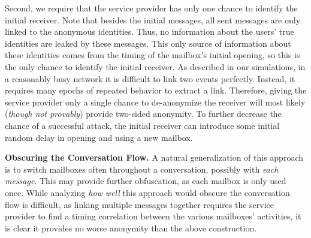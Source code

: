 Second, we require that the service provider has only one chance to identify the initial receiver.  Note that besides the initial messages, all sent messages are only linked to the anonymous identities.  Thus, no information about the users' true identities are leaked by these messages.  This only source of information about these identities comes from the timing of the mailbox's initial opening, so this is the only chance to identify the initial receiver.   
As described in our simulations, in a reasonably busy network it is difficult to link two events perfectly.  Instead, it requires many epochs of repeated behavior to extract a link.  Therefore, giving the service provider only a single chance to de-anonymize the receiver will most likely (\emph{though not provably}) provide two-sided anonymity.
To further decrease the chance of a successful attack, the initial receiver can introduce some initial random delay in opening and using a new mailbox.%

\medskip \noindent
\textbf{Obscuring the Conversation Flow.} A natural generalization of this approach is to switch mailboxes often throughout a conversation, possibly with {\em each message}.
This may provide further obfuscation, as each mailbox is only used once.  While analyzing {\em how well} this approach would obscure the conversation flow is difficult, as linking multiple messages together requires the service provider to find a timing correlation between the various mailboxes' activities, it is clear it provides no worse anonymity than the above construction.

